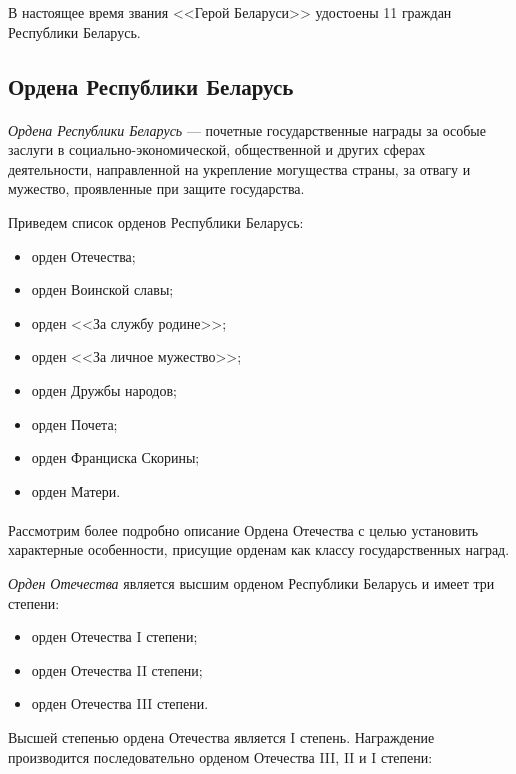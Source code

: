 В настоящее время звания <<Герой Беларуси>> удостоены 11 граждан
Республики Беларусь.

\subsection{Ордена Республики Беларусь}

\paragraph{}
\textit{Ордена Республики Беларусь} --- почетные государственные награды
за особые заслуги в социально-экономической,
общественной и других сферах деятельности,
направленной на укрепление могущества страны, за отвагу и мужество,
проявленные при защите государства.

Приведем список орденов Республики Беларусь:
\begin{itemize}
\item орден Отечества;
\item орден Воинской славы;
\item орден <<За службу родине>>;
\item орден <<За личное мужество>>;
\item орден Дружбы народов;
\item орден Почета;
\item орден Франциска Скорины;
\item орден Матери.
\end{itemize}

\paragraph{}
Рассмотрим более подробно описание Ордена Отечества с целью установить 
характерные особенности, присущие орденам как классу государственных наград.

\textit{Орден Отечества} является высшим орденом Республики Беларусь и
имеет три степени:

\begin{itemize}
\item орден Отечества I степени;
\item орден Отечества II степени;
\item орден Отечества III степени.
\end{itemize}

Высшей степенью ордена Отечества является I степень.
Награждение производится последовательно орденом Отечества III, II и I степени:

